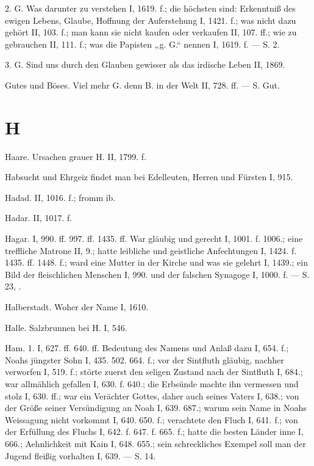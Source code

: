 2.  G. Was darunter zu verstehen I,
1619. f.; die höchsten sind: Erkenntniß des ewigen Lebens, Glaube, Hoffnung der Auferstehung I, 1421. f.; was nicht dazu gehört II, 103. f.; man kann sie nicht kaufen oder verkaufen II, 107. ff.; wie zu gebrauchen II, 111. f.; was die Papisten „g. G.“ nennen I, 1619. f. — S.  2.

3.  G. Sind uns durch den Glauben gewisser als das irdische Leben II, 1869.

Gutes und Böses. Viel mehr G. denn B. in der Welt II, 728. ff. — S. Gut.

\section{H}

Haare. Ursachen grauer H. II, 1799. f.

Habsucht und Ehrgeiz findet man bei Edelleuten, Herren und Fürsten I, 915.

Hadad. II, 1016. f.; fromm ib.

Hadar. II, 1017. f.

Hagar. I, 990. ff. 997. ff. 1435. ff. War gläubig und gerecht I, 1001. f. 1006.; eine treffliche Matrone II, 9.; hatte leibliche und geistliche Anfechtungen I, 1424. f. 1435. ff. 1448. f.; ward eine Mutter in der Kirche und was sie gelehrt I, 1439.; ein Bild der fleischlichen Menschen I, 990. und der falschen Synagoge I, 1000. f. — S.  23, .

Halberstadt. Woher der Name I, 1610.

Halle. Salzbrunnen bei H. I, 546.

Ham. 1.  I, 627. ff. 640. ff. Bedeutung des Namens und Anlaß dazu I, 654. f.; Noahs jüngster Sohn I, 435. 502. 664. f.; vor der Sintfluth gläubig, nachher verworfen I, 519. f.; störte zuerst den seligen Zustand nach der Sintfluth I, 684.; war allmählich gefallen I, 630. f. 640.; die Erbsünde machte ihn vermessen und stolz I, 630. ff.; war ein Verächter Gottes, daher auch seines Vaters I, 638.; von der Größe seiner Versündigung an Noah I, 639. 687.; warum sein Name in Noahs Weissagung nicht vorkommt I, 640. 650. f.; verachtete den Fluch I, 641. f.; von der Erfüllung des Fluchs I, 642. f. 647. f. 665. f.; hatte die besten Länder inne I, 666.; Aehnlichkeit mit Kain I, 648. 655.; sein schreckliches Exempel soll man der Jugend fleißig vorhalten I, 639. — S.  14.


